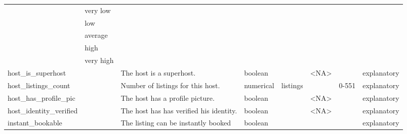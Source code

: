 \begin{center}
\begin{xltabular}{\textwidth}{llXlllll}
                            & very low                       &                                   &             &                &                             &                     &  \\
                            & low                         &                                   &             &                &                             &                     &  \\
                            & average                     &                                   &             &                &                             &                     &  \\
                            & high                        &                                   &             &                &                             &                     &  \\
                            & very high                   &                                   &             &                &                             &                     &  \\
host\_is\_superhost         &                             & The host is a superhost. & boolean &                & \textless{}NA\textgreater{} &                     & explanatory \\
host\_listings\_count        &                             & Number of listings for this host. & numerical     & listings       &                             &                     0-551   & explanatory \\
host\_has\_profile\_pic     &                             & The host has a profile picture. & boolean     &                & \textless{}NA\textgreater{} &                     & explanatory \\
host\_identity\_verified    &                             & The host has has verified his identity. & boolean     &                & \textless{}NA\textgreater{} &                     & explanatory \\
instant\_bookable           &                             & The listing can be instantly booked & boolean     &                &                             &                     & explanatory \\


\end{xltabular}
\end{center}
